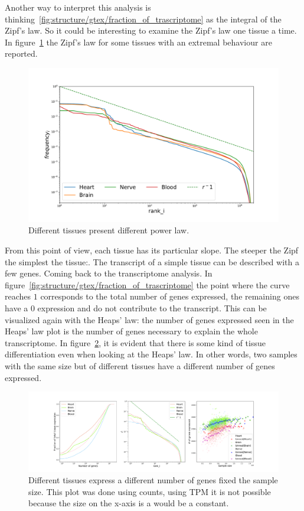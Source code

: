 Another way to interpret this analysis is thinking~\ref{fig:structure/gtex/fraction_of_trascriptome} as the integral of the Zipf's law. So it could be interesting to examine the Zipf's law one tissue a time. In figure~\ref{fig:structure/gtex/zipf_tissue} the Zipf's law for some tissues with an extremal behaviour are reported.
\begin{figure}[htb!]
  \centering
  \includegraphics[width=0.8\linewidth]{pictures/structure/gtex/zipf_tissue.pdf}
  \caption{Different tissues present different power law.}
  \label{fig:structure/gtex/zipf_tissue}
\end{figure}
From this point of view, each tissue has its particular slope. The steeper the Zipf the simplest the tissue:. The transcript of a simple tissue can be described with a few genes.
\FloatBarrier
Coming back to the transcriptome analysis. In figure~\ref{fig:structure/gtex/fraction_of_trascriptome} the point where the curve reaches $1$ corresponds to the total number of genes expressed, the remaining ones have a $0$ expression and do not contribute to the transcript. This can be visualized again with the Heaps' law: the number of genes expressed seen in the Heaps' law plot is the number of genes necessary to explain the whole transcriptome. In figure~\ref{fig:structure/gtex/heaps_tissue}, it is evident that there is some kind of tissue differentiation even when looking at the Heaps' law. In other words, two samples with the same size but of different tissues have a different number of genes expressed.
\begin{figure}[htb!]
  \centering
  \includegraphics[width=0.5\linewidth]{pictures/structure/gtex/heaps_tissue.pdf}
  \caption{Different tissues express a different number of genes fixed the sample size. This plot was done using counts, using TPM it is not possible because the size on the x-axis is a would be a constant.}
  \label{fig:structure/gtex/heaps_tissue}
\end{figure}
